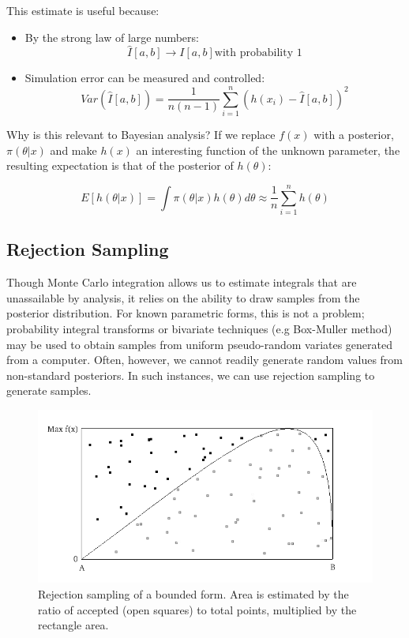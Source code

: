 \documentclass[]{book}
\begin{document}
\noindent This estimate is useful because:

\begin{itemize}
\item
By the strong law of large numbers:
\[\hat{I}[a,b] \rightarrow I[a,b] \mbox{with probability 1}\]
\item
Simulation error can be measured and controlled:
\[Var(\hat{I}[a,b]) = \frac{1}{n(n-1)}\sum_{i=1}^n (h(x_i)-\hat{I}[a,b])^2\]
\end{itemize}

Why is this relevant to Bayesian analysis? If we replace $f(x)$ with a posterior, $\pi(\theta|x)$ and make $h(x)$ an interesting function of the unknown parameter, the resulting expectation is that of the posterior of $h(\theta)$:

\[
E[h(\theta|x)] = \int \pi(\theta|x) h(\theta) d\theta \approx \frac{1}{n}\sum_{i=1}^n h(\theta)
\]

\subsection{Rejection Sampling}

Though Monte Carlo integration allows us to estimate integrals that are unassailable by analysis, it relies on the ability to draw samples from the posterior distribution. For known parametric forms, this is not a problem; probability integral transforms or bivariate techniques (e.g Box-Muller method) may be used to obtain samples from uniform pseudo-random variates generated from a computer. Often, however, we cannot readily generate random values from non-standard posteriors. In such instances, we can use rejection sampling to generate samples.

\begin{figure}[ht]
        \begin{center}
        \includegraphics[scale=0.4]{reject.png}
    \end{center}
    \caption{Rejection sampling of a bounded form. Area is estimated by the ratio of accepted (open squares) to total points, multiplied by the rectangle area.}
    \label{fig:bound}
\end{figure}
\end{document}
